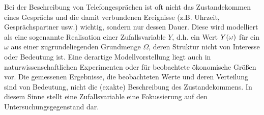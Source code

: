 \documentclass{lecture}
\begin{document}
    Bei der Beschreibung von Telefongesprächen ist oft nicht das Zustandekommen eines Gesprächs und die damit verbundenen Ereignisse (z.B. Uhrzeit, Gesprächspartner usw.) wichtig, sondern nur dessen Dauer.
    Diese wird modelliert als eine sogenannte Realisation einer Zufallsvariable \(Y\), d.h. ein Wert \(Y\parentheses*{\omega}\) für ein \(\omega\) aus einer zugrundeliegenden Grundmenge \(\Omega\), deren Struktur nicht von Interesse oder Bedeutung ist.
    Eine derartige Modellvorstellung liegt auch in naturwissenschaftlichen Experimenten oder für beobachtete ökonomische Größen vor.
    Die gemessenen Ergebnisse, die beobachteten Werte und deren Verteilung sind von Bedeutung, nicht die (exakte) Beschreibung des Zustandekommens.
    In diesem Sinne stellt eine Zufallsvariable eine Fokussierung auf den Untersuchungsgegenstand dar.
\end{document}
